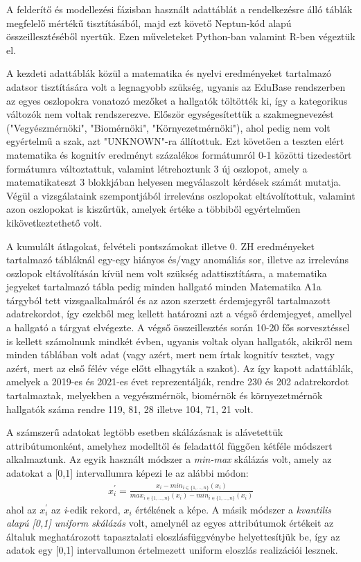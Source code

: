 \documentclass[12pt]{article}
\begin{document}
A felderítő és modellezési fázisban használt adattáblát a rendelkezésre álló táblák megfelelő mértékű tisztításából, majd ezt követő Neptun-kód alapú összeillesztéséből nyertük. Ezen műveleteket Python-ban valamint R-ben végeztük el.

A kezdeti adattáblák közül a matematika és nyelvi eredményeket tartalmazó adatsor tisztítására volt a legnagyobb szükség, ugyanis az EduBase rendszerben az egyes oszlopokra vonatozó mezőket a hallgatók töltötték ki, így a kategorikus változók nem voltak rendszerezve. Először egységesítettük a szakmegnevezést ("Vegyészmérnöki", "Biomérnöki", "Környezetmérnöki"), ahol pedig nem volt egyértelmű a szak, azt "UNKNOWN"-ra állítottuk. Ezt követően a teszten elért matematika és kognitív eredményt százalékos formátumról 0-1 közötti tizedestört formátumra változtattuk, valamint létrehoztunk 3 új oszlopot, amely a matematikateszt 3 blokkjában helyesen megválaszolt kérdések számát mutatja. Végül a vizsgálataink szempontjából irreleváns oszlopokat eltávolítottuk, valamint azon oszlopokat is kiszűrtük, amelyek értéke a többiből egyértelműen kikövetkeztethető volt. 

A kumulált átlagokat, felvételi pontszámokat illetve 0. ZH eredményeket tartalmazó tábláknál egy-egy hiányos és/vagy anomáliás sor, illetve az irreleváns oszlopok eltávolításán kívül nem volt szükség adattisztításra, a matematika jegyeket tartalmazó tábla pedig minden hallgató minden Matematika A1a tárgyból tett vizsgaalkalmáról és az azon szerzett érdemjegyről tartalmazott adatrekordot, így ezekből meg kellett határozni azt a végső érdemjegyet, amellyel a hallgató a tárgyat elvégezte. A végső összeillesztés során 10-20 fős sorvesztéssel is kellett számolnunk mindkét évben, ugyanis voltak olyan hallgatók, akikről nem minden táblában volt adat (vagy azért, mert nem írtak kognitív tesztet, vagy azért, mert az első félév vége előtt elhagyták a szakot). Az így kapott adattáblák, amelyek a 2019-es és 2021-es évet reprezentálják, rendre 230 és 202 adatrekordot tartalmaztak, melyekben a vegyészmérnök, biomérnök és környezetmérnök hallgatók száma rendre 119, 81, 28 illetve 104, 71, 21 volt.

A számszerű adatokat legtöbb esetben skálázásnak is alávetettük attribútumonként, amelyhez modelltől és feladattól függően kétféle módszert alkalmaztunk. Az egyik használt módszer a \emph{min-max} skálázás volt, amely az adatokat a [0,1] intervallumra képezi le az alábbi módon:\\
\begin{align}
x_{i}^{'} = \frac{x_{i}-min_{i \in \{1,\dots,n\}}(x_{i})}{max_{i \in \{1,\dots,n\}}(x_{i})-min_{i \in \{1,\dots,n\}}(x_{i})}
\end{align}
ahol az $x_{i}^{'}$ az \emph{i}-edik rekord, $x_i$ értékének a képe. A másik módszer a \emph{kvantilis alapú [0,1] uniform skálázás} volt, amelynél az egyes attribútumok értékeit az általuk meghatározott tapasztalati eloszlásfüggvénybe helyettesítjük be, így az adatok egy [0,1] intervallumon értelmezett uniform eloszlás realizációi lesznek.
\end{document}
